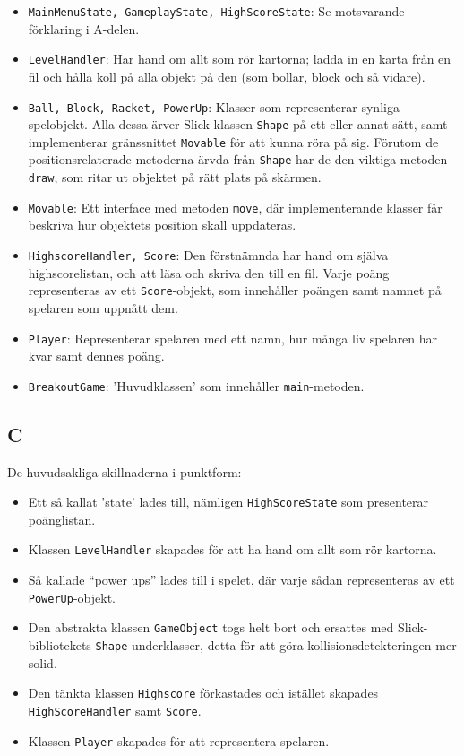 \documentclass[11pt,a4paper]{article}
\begin{document}
\begin{itemize}
	\item \texttt{MainMenuState, GameplayState, HighScoreState}: Se motsvarande förklaring i A-delen.
	\item \texttt{LevelHandler}: Har hand om allt som rör kartorna; ladda in en karta från en fil och hålla koll på alla objekt på den (som bollar, block och så vidare).
	\item \texttt{Ball, Block, Racket, PowerUp}: Klasser som representerar synliga spelobjekt. Alla dessa ärver Slick-klassen \texttt{Shape} på ett eller annat sätt, samt implementerar gränssnittet \texttt{Movable} för att kunna röra på sig. Förutom de positionsrelaterade metoderna ärvda från \texttt{Shape} har de den viktiga metoden \texttt{draw}, som ritar ut objektet på rätt plats på skärmen.
	\item \texttt{Movable}: Ett interface med metoden \texttt{move}, där implementerande klasser får beskriva hur objektets position skall uppdateras.
	\item \texttt{HighscoreHandler, Score}: Den förstnämnda har hand om själva highscorelistan, och att läsa och skriva den till en fil. Varje poäng representeras av ett \texttt{Score}-objekt, som innehåller poängen samt namnet på spelaren som uppnått dem.
	\item \texttt{Player}: Representerar spelaren med ett namn, hur många liv spelaren har kvar samt dennes poäng.
	\item \texttt{BreakoutGame}: 'Huvudklassen' som innehåller \texttt{main}-metoden.
\end{itemize}

\subsection{C}
De huvudsakliga skillnaderna i punktform:

\begin{itemize}
	\item Ett så kallat 'state' lades till, nämligen \texttt{HighScoreState} som presenterar poänglistan.
	\item Klassen \texttt{LevelHandler} skapades för att ha hand om allt som rör kartorna.
	\item Så kallade ``power ups'' lades till i spelet, där varje sådan representeras av ett \texttt{PowerUp}-objekt.
	\item Den abstrakta klassen \texttt{GameObject} togs helt bort och ersattes med Slick-bibliotekets \texttt{Shape}-underklasser, detta för att göra kollisionsdetekteringen mer solid.
	\item Den tänkta klassen \texttt{Highscore} förkastades och istället skapades \texttt{HighScoreHandler} samt \texttt{Score}.
	\item Klassen \texttt{Player} skapades för att representera spelaren.
\end{itemize}
\end{document}
